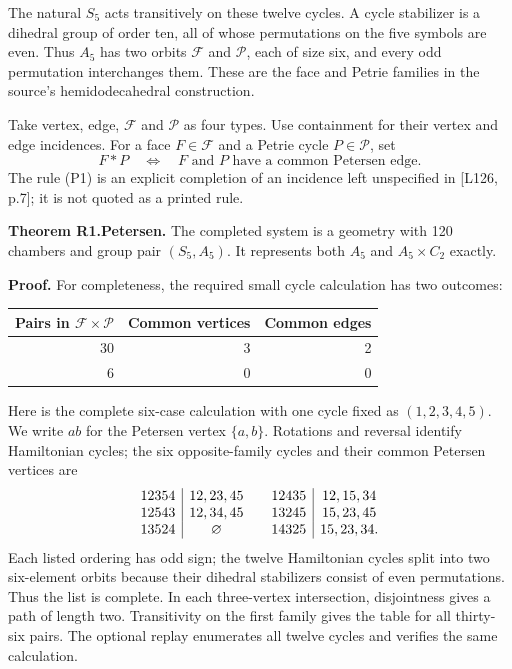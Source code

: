 The natural \(S_5\) acts transitively on these twelve cycles. A cycle
stabilizer is a dihedral group of order ten, all of whose permutations
on the five symbols are even. Thus \(A_5\) has two orbits \(\mathcal F\)
and \(\mathcal P\), each of size six, and every odd permutation
interchanges them. These are the face and Petrie families in the
source's hemidodecahedral construction.

Take vertex, edge, \(\mathcal F\) and \(\mathcal P\) as four types. Use
containment for their vertex and edge incidences. For a face
\(F\in\mathcal F\) and a Petrie cycle \(P\in\mathcal P\), set \[
F*P\quad\Longleftrightarrow\quad F\text{ and }P\text{ have a common Petersen edge}.
\tag{P1}
\] The rule (P1) is an explicit completion of an incidence left
unspecified in {[}L126, p.7{]}; it is not quoted as a printed rule.

\textbf{Theorem R1.Petersen.} The completed system is a geometry with
120 chambers and group pair \((S_5,A_5)\). It represents both \(A_5\)
and \(A_5\times C_2\) exactly.

\textbf{Proof.} For completeness, the required small cycle calculation
has two outcomes:

\begin{center}
\begin{tabular}{rrr}
\toprule
Pairs in $\mathcal F\times\mathcal P$ & Common vertices & Common edges\\
\midrule
30&3&2\\6&0&0\\\bottomrule
\end{tabular}
\end{center}

Here is the complete six-case calculation with one cycle fixed as
$(1,2,3,4,5)$. We write $ab$ for the Petersen vertex $\{a,b\}$.
Rotations and reversal identify Hamiltonian cycles; the six opposite-family
cycles and their common Petersen vertices are
\[
\begin{array}{c|c@{\qquad}c|c}
12354&12,23,45&12435&12,15,34\\
12543&12,34,45&13245&15,23,45\\
13524&\varnothing&14325&15,23,34.
\end{array}
\]
Each listed ordering has odd sign; the twelve Hamiltonian cycles split
into two six-element orbits because their dihedral stabilizers consist
of even permutations. Thus the list is complete. In each three-vertex
intersection, disjointness gives a path of length two. Transitivity on
the first family gives the table for all thirty-six pairs. The optional
replay enumerates all twelve cycles and verifies the same calculation.

